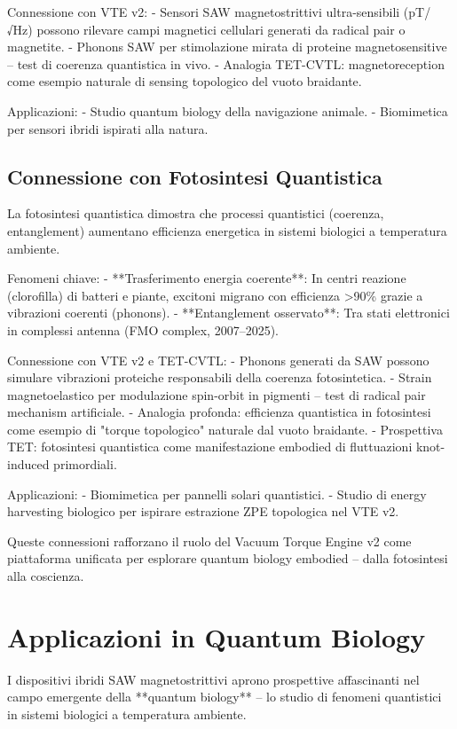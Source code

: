 \documentclass[11pt,a4paper]{article}
\begin{document}
Connessione con VTE v2:
- Sensori SAW magnetostrittivi ultra-sensibili (pT/√Hz) possono rilevare campi magnetici cellulari generati da radical pair o magnetite.
- Phonons SAW per stimolazione mirata di proteine magnetosensitive – test di coerenza quantistica in vivo.
- Analogia TET-CVTL: magnetoreception come esempio naturale di sensing topologico del vuoto braidante.

Applicazioni:
- Studio quantum biology della navigazione animale.
- Biomimetica per sensori ibridi ispirati alla natura.

\subsection{Connessione con Fotosintesi Quantistica}

La fotosintesi quantistica dimostra che processi quantistici (coerenza, entanglement) aumentano efficienza energetica in sistemi biologici a temperatura ambiente.

Fenomeni chiave:
- **Trasferimento energia coerente**: In centri reazione (clorofilla) di batteri e piante, excitoni migrano con efficienza >90\% grazie a vibrazioni coerenti (phonons).
- **Entanglement osservato**: Tra stati elettronici in complessi antenna (FMO complex, 2007–2025).

Connessione con VTE v2 e TET-CVTL:
- Phonons generati da SAW possono simulare vibrazioni proteiche responsabili della coerenza fotosintetica.
- Strain magnetoelastico per modulazione spin-orbit in pigmenti – test di radical pair mechanism artificiale.
- Analogia profonda: efficienza quantistica in fotosintesi come esempio di "torque topologico" naturale dal vuoto braidante.
- Prospettiva TET: fotosintesi quantistica come manifestazione embodied di fluttuazioni knot-induced primordiali.

Applicazioni:
- Biomimetica per pannelli solari quantistici.
- Studio di energy harvesting biologico per ispirare estrazione ZPE topologica nel VTE v2.

Queste connessioni rafforzano il ruolo del Vacuum Torque Engine v2 come piattaforma unificata per esplorare quantum biology embodied – dalla fotosintesi alla coscienza.


\section{Applicazioni in Quantum Biology}

I dispositivi ibridi SAW magnetostrittivi aprono prospettive affascinanti nel campo emergente della **quantum biology** – lo studio di fenomeni quantistici in sistemi biologici a temperatura ambiente.
\end{document}

